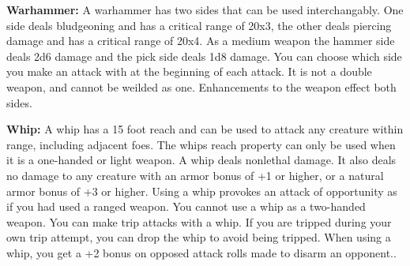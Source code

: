 \textbf{Warhammer:} A warhammer has two sides that can be used interchangably. One side deals bludgeoning and has a critical range of 20x3, the other deals piercing damage and has a critical range of 20x4. As a medium weapon the hammer side deals 2d6 damage and the pick side deals 1d8 damage. You can choose which side you make an attack with at the beginning of each attack. It is not a double weapon, and cannot be weilded as one. Enhancements to the weapon effect both sides.

\textbf{Whip:} A whip has a 15 foot reach and can be used to attack any creature within range, including adjacent foes. The whips reach property can only be used when it is a one-handed or light weapon. A whip deals nonlethal damage. It also deals no damage to any creature with an armor bonus of +1 or higher, or a natural armor bonus of +3 or higher. Using a whip provokes an attack of opportunity as if you had used a ranged weapon. You cannot use a whip as a two-handed weapon. You can make trip attacks with a whip. If you are tripped during your own trip attempt, you can drop the whip to avoid being tripped. When using a whip, you get a +2 bonus on opposed attack rolls made to disarm an opponent..